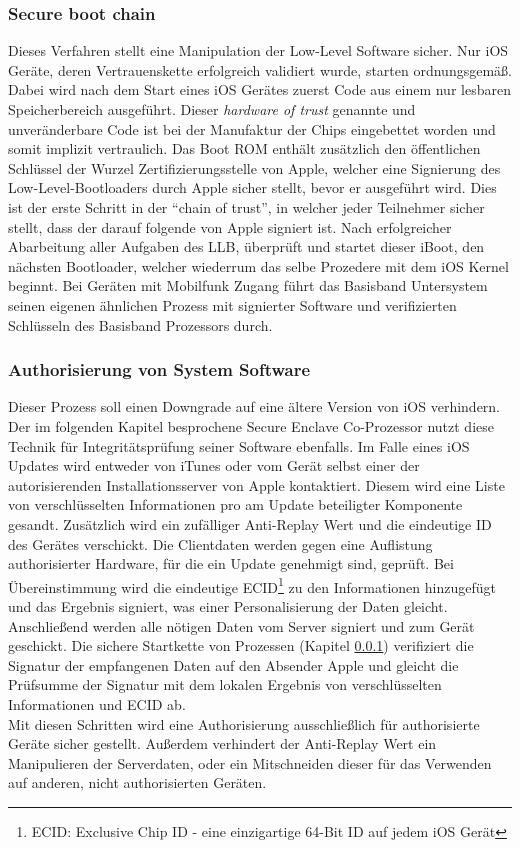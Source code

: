 	\subsubsection{Secure boot chain}\label{sec:secure-boot-chain}
		Dieses Verfahren stellt eine Manipulation der Low-Level Software sicher. Nur
		iOS Geräte, deren Vertrauenskette erfolgreich validiert wurde, starten
		ordnungsgemäß. Dabei wird nach dem Start eines iOS Gerätes zuerst Code aus
		einem nur lesbaren Speicherbereich ausgeführt. Dieser \textit{hardware of
		trust} genannte und unveränderbare Code ist bei der Manufaktur der Chips
		eingebettet worden und somit implizit vertraulich. Das Boot ROM enthält
		zusätzlich den öffentlichen Schlüssel der Wurzel Zertifizierungsstelle von
		Apple, welcher eine Signierung des Low-Level-Bootloaders durch Apple sicher
		stellt, bevor er ausgeführt wird.
		Dies ist der erste Schritt in der "`chain of trust"', in welcher jeder
		Teilnehmer sicher stellt, dass der darauf folgende von Apple signiert ist. 		
		Nach erfolgreicher Abarbeitung aller Aufgaben des LLB, überprüft und startet
		dieser iBoot, den nächsten Bootloader, welcher wiederrum das selbe Prozedere
		mit dem iOS Kernel beginnt. Bei Geräten mit Mobilfunk Zugang führt das
		Basisband Untersystem seinen eigenen ähnlichen Prozess mit signierter 
		Software und verifizierten Schlüsseln des Basisband Prozessors durch.
		
	\subsubsection{Authorisierung von System Software}\label{sec:code-signing}
		Dieser Prozess soll einen Downgrade auf eine ältere Version von iOS
		verhindern. Der im folgenden Kapitel besprochene Secure Enclave Co-Prozessor
		nutzt diese Technik für Integritätsprüfung seiner Software ebenfalls. Im Falle
		eines iOS Updates wird entweder von iTunes oder vom Gerät selbst einer der
		autorisierenden Installationsserver von Apple kontaktiert. Diesem
		wird eine Liste von verschlüsselten Informationen pro am Update beteiligter
		Komponente gesandt. Zusätzlich wird ein zufälliger
		Anti-Replay Wert und die eindeutige ID des Gerätes
		verschickt. Die Clientdaten werden gegen eine Auflistung authorisierter Hardware, für die ein
		Update genehmigt sind, geprüft. Bei Übereinstimmung wird die eindeutige
		ECID\footnote{ECID: Exclusive Chip ID - eine einzigartige 64-Bit ID auf jedem
		iOS Gerät} zu den Informationen hinzugefügt und das Ergebnis signiert, was einer Personalisierung der Daten gleicht.
		Anschließend werden alle nötigen Daten vom Server signiert und zum Gerät
		geschickt. Die sichere Startkette von Prozessen (Kapitel
		\ref{sec:secure-boot-chain}) verifiziert die Signatur der empfangenen Daten
		auf den Absender Apple und gleicht die Prüfsumme der Signatur mit dem lokalen
		Ergebnis von verschlüsselten Informationen und ECID ab.\\
		Mit diesen Schritten wird eine Authorisierung ausschließlich für authorisierte
		Geräte sicher gestellt. Außerdem verhindert der Anti-Replay Wert ein
		Manipulieren der Serverdaten, oder ein Mitschneiden dieser für
		das Verwenden auf anderen, nicht authorisierten Geräten.
